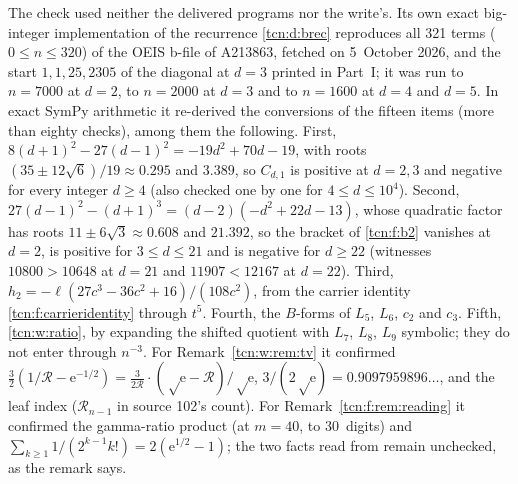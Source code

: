 \documentclass[11pt,letterpaper]{article}
\newcommand{\ee}{\mathrm e}
\theoremstyle{remark}
\begin{document}
The check used neither the delivered programs nor the write's. Its own exact big-integer implementation of the recurrence \eqref{tcn:d:brec} reproduces all 321 terms ($0\le n\le320$) of the OEIS b-file of A213863, fetched on 5~October 2026, and the start $1,1,25,2305$ of the diagonal at $d=3$ printed in Part~I; it was run to $n=7000$ at $d=2$, to $n=2000$ at $d=3$ and to $n=1600$ at $d=4$ and $d=5$. In exact SymPy arithmetic it re-derived the conversions of the fifteen items (more than eighty checks), among them the following. First, $8(d+1)^2-27(d-1)^2=-19d^2+70d-19$, with roots $(35\pm12\sqrt6)/19\approx0.295$ and $3.389$, so $C_{d,1}$ is positive at $d=2,3$ and negative for every integer $d\ge4$ (also checked one by one for $4\le d\le10^4$). Second, $27(d-1)^2-(d+1)^3=(d-2)(-d^2+22d-13)$, whose quadratic factor has roots $11\pm6\sqrt3\approx0.608$ and $21.392$, so the bracket of \eqref{tcn:f:b2} vanishes at $d=2$, is positive for $3\le d\le21$ and is negative for $d\ge22$ (witnesses $10800>10648$ at $d=21$ and $11907<12167$ at $d=22$). Third, $h_2=-\ell(27c^3-36c^2+16)/(108c^2)$, from the carrier identity \eqref{tcn:f:carrieridentity} through $t^5$. Fourth, the $B$-forms of $L_5$, $L_6$, $c_2$ and $c_3$. Fifth, \eqref{tcn:w:ratio}, by expanding the shifted quotient with $L_7$, $L_8$, $L_9$ symbolic; they do not enter through $n^{-3}$. For Remark~\ref{tcn:w:rem:tv} it confirmed $\tfrac32(1/\mathcal R-\ee^{-1/2})=\tfrac3{2\mathcal R}\cdot(\sqrt\ee-\mathcal R)/\sqrt\ee$, $3/(2\sqrt\ee)=0.9097959896\ldots$, and the leaf index ($\mathcal R_{n-1}$ in source 102's count). For Remark~\ref{tcn:f:rem:reading} it confirmed the gamma-ratio product (at $m=40$, to 30~digits) and $\sum_{k\ge1}1/(2^{k-1}k!)=2(\ee^{1/2}-1)$; the two facts read from \cite{Chang2024} remain unchecked, as the remark says.
\end{document}
